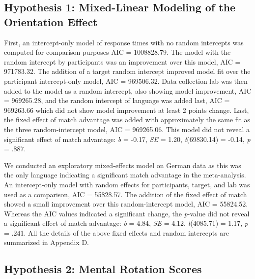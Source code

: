 \documentclass[
  man,floatsintext]{apa7}
\begin{document}
\hypertarget{hypothesis-1-mixed-linear-modeling-of-the-orientation-effect}{%
\subsection{Hypothesis 1: Mixed-Linear Modeling of the Orientation Effect}\label{hypothesis-1-mixed-linear-modeling-of-the-orientation-effect}}

First, an intercept-only model of response times with no random
intercepts was computed for comparison purposes AIC =
1008828.79. The
model with the random intercept by participants was an improvement over
this model, AIC =
971783.32. The
addition of a target random intercept improved model fit over the
participant intercept-only model, AIC =
969506.32. Data
collection lab was then added to the model as a random intercept, also
showing model improvement, AIC =
969265.28, and the
random intercept of language was added last, AIC =
969263.66 which did
not show model improvement at least 2 points change. Last, the fixed
effect of match advantage was added with approximately the same fit as
the three random-intercept model, AIC =
969265.06. This model
did not reveal a significant effect of match advantage: \emph{b} =
-0.17, \emph{SE} =
1.20,
\emph{t}(69830.14) =
-0.14, \emph{p} =
.887.

We conducted an exploratory mixed-effects model on German data as this
was the only language indicating a significant match advantage in the
meta-analysis. An intercept-only model with random effects for
participants, target, and lab was used as a comparison, AIC =
55828.57. The
addition of the fixed effect of match showed a small improvement over
this random-intercept model, AIC =
55824.52.
Whereas the AIC values indicated a significant change, the \emph{p}-value did
not reveal a significant effect of match advantage: \emph{b} =
4.84, \emph{SE} =
4.12,
\emph{t}(4085.71) =
1.17, \emph{p} =
.241. All the details of the above fixed
effects and random intercepts are summarized in Appendix D.

\hypertarget{hypothesis-2-mental-rotation-scores}{%
\subsection{Hypothesis 2: Mental Rotation Scores}\label{hypothesis-2-mental-rotation-scores}}
\end{document}
